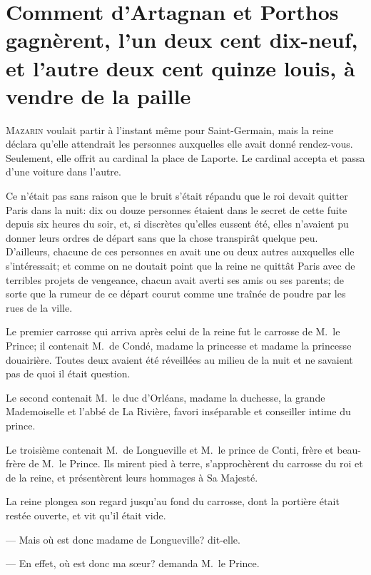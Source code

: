 \chapter[Comment d'Artagnan et Porthos gagnèrent à vendre de la paille]{Comment d'Artagnan et Porthos gagnèrent, l'un deux cent dix-neuf, et l'autre deux cent quinze louis, à vendre de la paille}

\lettrine{M}{azarin} voulait partir à l'instant même pour Saint-Germain, mais la reine déclara qu'elle attendrait les personnes auxquelles elle avait donné rendez-vous. Seulement, elle offrit au cardinal la place de Laporte. Le cardinal accepta et passa d'une voiture dans l'autre.

Ce n'était pas sans raison que le bruit s'était répandu que le roi devait quitter Paris dans la nuit: dix ou douze personnes étaient dans le secret de cette fuite depuis six heures du soir, et, si discrètes qu'elles eussent été, elles n'avaient pu donner leurs ordres de départ sans que la chose transpirât quelque peu. D'ailleurs, chacune de ces personnes en avait une ou deux autres auxquelles elle s'intéressait; et comme on ne doutait point que la reine ne quittât Paris avec de terribles projets de vengeance, chacun avait averti ses amis ou ses parents; de sorte que la rumeur de ce départ courut comme une traînée de poudre par les rues de la ville.

Le premier carrosse qui arriva après celui de la reine fut le carrosse de M.~le Prince; il contenait M.~de Condé, madame la princesse et madame la princesse douairière. Toutes deux avaient été réveillées au milieu de la nuit et ne savaient pas de quoi il était question.

Le second contenait M.~le duc d'Orléans, madame la duchesse, la grande Mademoiselle et l'abbé de La Rivière, favori inséparable et conseiller intime du prince.

Le troisième contenait M.~de Longueville et M.~le prince de Conti, frère et beau-frère de M.~le Prince. Ils mirent pied à terre, s'approchèrent du carrosse du roi et de la reine, et présentèrent leurs hommages à Sa Majesté.

La reine plongea son regard jusqu'au fond du carrosse, dont la portière était restée ouverte, et vit qu'il était vide.

— Mais où est donc madame de Longueville? dit-elle.

— En effet, où est donc ma sœur? demanda M.~le Prince.

